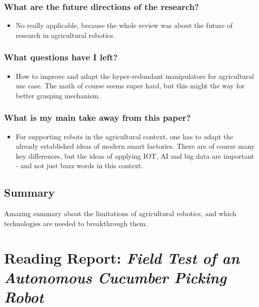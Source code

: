     \subsubsection*{What are the future directions of the research?}
    \begin{itemize}
        \item No really applicable, because the whole review was about the future of research in agricultural robotics.
    \end{itemize}
    \subsubsection*{What questions have I left?}
    \begin{itemize}
        \item How to improve and adapt the hyper-redundant manipulators for agricultural use case. The math of course seems super hard, but this might the way for better grasping mechanism.
    \end{itemize}
    \subsubsection*{What is my main take away from this paper?}
    \begin{itemize}
        \item For supporting robots in the agricultural context, one has to adapt the already established ideas of modern smart factories. There are of course many key differences, but the ideas of applying IOT, AI and big data are important  - and not just buzz words in this context.
    \end{itemize}
    
    \subsection*{Summary}
    Amazing summary about the limitations of agricultural robotics, and which technologies are needed to breakthrough them.
    

    
    \newpage
    \section{Reading Report: \emph{Field Test of an Autonomous Cucumber Picking Robot}}
    \label{sec:Henten2003}
    \cite{Henten2003}
    
